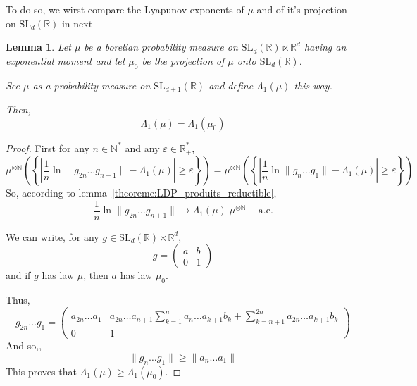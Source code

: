 \documentclass[11pt]{amsart}
\newtheorem{lemma}[theorem]{Lemma}
\theoremstyle{definition}
\theoremstyle{remark}
\numberwithin{equation}{section}
\begin{document}
To do so, we wirst compare the Lyapunov exponents of $\mu$ and of it's projection on $\mathrm{SL}_d({\mathbb R})$ in next

\begin{lemma}\label{lemma:lyapunov_affine}
Let $\mu$ be a borelian probability measure on $\mathrm{SL}_d({\mathbb R}) \ltimes {\mathbb R}^d$ having an exponential moment and let $\mu_0$ be the projection of $\mu$ onto $\mathrm{SL}_d({\mathbb R})$.

See $\mu$ as a probability measure on $\mathrm{SL}_{d+1}({\mathbb R})$ and define $\Lambda_1(\mu)$ this way.

Then,
\[
\Lambda_1(\mu) = \Lambda_1(\mu_0)
\]
\end{lemma}

\begin{proof}
First for any $n\in {\mathbb N}^\ast$ and any $\varepsilon \in {\mathbb R}_+^\ast$,
\[
\mu^{\otimes {\mathbb N}} \left(\left\{  \left| \frac 1 n \ln \|g_{2n} \dots g_{n+1}\| - \Lambda_1 (\mu)\right| \geqslant \varepsilon \right\}\right) = \mu^{\otimes {\mathbb N}} \left(\left\{  \left|\frac 1 n \ln \|g_n \dots g_1\| - \Lambda_1 (\mu)\right| \geqslant \varepsilon \right\}\right)
\]
So, according to lemma~\ref{theoreme:LDP_produits_reductible},
\[
\frac 1 n \ln \| g_{2n} \dots g_{n+1} \| \xrightarrow\, \Lambda_1(\mu) \;\mu^{\otimes{\mathbb N}}-\text{a.e.}
\]

We can write, for any $g\in \mathrm{SL}_d({\mathbb R}) \ltimes {\mathbb R}^d$,
\[
g =\left( \begin{array}{cc}a & b\\0&1 \end{array}\right)
\]
and if $g$ has law $\mu$, then $a$ has law $\mu_0$.

Thus,
\[
g_{2n} \dots g_1 = \left(\begin{array}{cc}
a_{2n} \dots a_1 &a_{2n} \dots a_{n+1} \sum_{k=1}^{n} a_n \dots a_{k+1} b_k + \sum_{k=n+1}^{2n} a_{2n} \dots a_{k+1} b_k \\ 0 & 1
\end{array} \right)
\]
And so,,
\[
\|g_n \dots g_1 \| \geqslant \|a_n \dots a_1\|
\]
This proves that $\Lambda_1(\mu) \geqslant \Lambda_1(\mu_0)$.


\end{proof}
\end{document}
